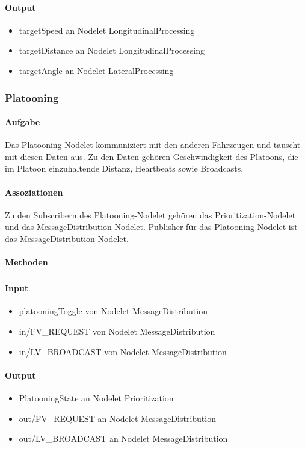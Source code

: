 \documentclass[a4paper, 12pt, titlepage]{scrartcl}
\begin{document}
				\paragraph{Output}
				    \begin{itemize}
				        \item targetSpeed an Nodelet LongitudinalProcessing
				        \item targetDistance an Nodelet LongitudinalProcessing
				        \item targetAngle an Nodelet LateralProcessing
				    \end{itemize}

			\subsubsection{Platooning}
			\label{platooning}
				\paragraph{Aufgabe} Das Platooning-Nodelet kommuniziert mit den anderen Fahrzeugen und tauscht mit diesen Daten aus. Zu den Daten gehören Geschwindigkeit des Platoons, die im Platoon einzuhaltende Distanz, Heartbeats sowie Broadcasts.
				\paragraph{Assoziationen} Zu den Subscribern des Platooning-Nodelet gehören das Prioritization-Nodelet und das MessageDistribution-Nodelet. Publisher für das Platooning-Nodelet ist das MessageDistribution-Nodelet.
				\paragraph{Methoden}
					\subparagraph{}
				\paragraph{Input}
				    \begin{itemize}
    					\item platooningToggle von Nodelet MessageDistribution
    					\item in/FV\_REQUEST von Nodelet MessageDistribution
    					\item in/LV\_BROADCAST von Nodelet MessageDistribution
    				\end{itemize}
				\paragraph{Output}
					\begin{itemize}
    					\item PlatooningState an Nodelet Prioritization
    					\item out/FV\_REQUEST an Nodelet MessageDistribution
    					\item out/LV\_BROADCAST an Nodelet MessageDistribution
    				\end{itemize}
\end{document}
